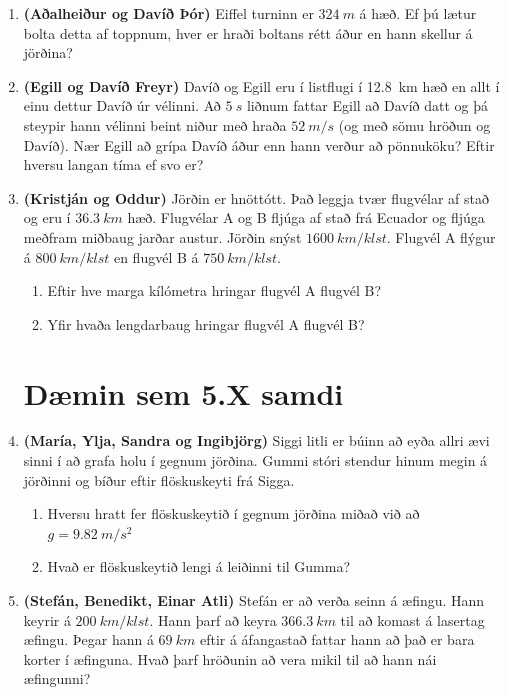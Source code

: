 \begin{enumerate}[label = \textbf{Dæmi \thechapter.\arabic*.}]
\item \textbf{(Aðalheiður og Davíð Þór)} Eiffel turninn er $\SI{324}{m}$ á hæð. Ef þú lætur bolta detta af toppnum, hver er hraði boltans rétt áður en hann skellur á jörðina?

\item \textbf{(Egill og Davíð Freyr)} Davíð og Egill eru í listflugi í \SI{12.8}{km} hæð en allt í einu dettur Davíð úr vélinni. Að $\SI{5}{s}$ liðnum fattar Egill að Davíð datt og þá steypir hann vélinni beint niður með hraða $\SI{52}{m/s}$ (og með sömu hröðun og Davíð). Nær Egill að grípa Davíð áður enn hann verður að pönnuköku? Eftir hversu langan tíma ef svo er?

\item \textbf{(Kristján og Oddur)} Jörðin er hnöttótt. Það leggja tvær flugvélar af stað og eru í $\SI{36.3}{km}$ hæð. Flugvélar A og B fljúga af stað frá Ecuador og fljúga meðfram miðbaug jarðar austur. Jörðin snýst $\SI{1600}{km/klst}$. Flugvél A flýgur á $\SI{800}{km/klst}$ en flugvél B á $\SI{750}{km/klst}$.
\begin{enumerate}[label = \textbf{(\alph*)}]
    \item Eftir hve marga kílómetra hringar flugvél A flugvél B?
    \item Yfir hvaða lengdarbaug hringar flugvél A flugvél B?
\end{enumerate}

\section*{Dæmin sem 5.X samdi}

\item \textbf{(María, Ylja, Sandra og Ingibjörg)} Siggi litli er búinn að eyða allri ævi sinni í að grafa holu í gegnum jörðina. Gummi stóri stendur hinum megin á jörðinni og bíður eftir flöskuskeyti frá Sigga.
\begin{enumerate}[label = \textbf{(\alph*)}]
    \item Hversu hratt fer flöskuskeytið í gegnum jörðina miðað við að $g = \SI{9.82}{m/s^2}$
    
    \item Hvað er flöskuskeytið lengi á leiðinni til Gumma?
\end{enumerate}

\item \textbf{(Stefán, Benedikt, Einar Atli)} Stefán er að verða seinn á æfingu. Hann keyrir á $\SI{200}{km/klst}$. Hann þarf að keyra $\SI{366.3}{km}$ til að komast á lasertag æfingu. Þegar hann á $\SI{69}{km}$ eftir á áfangastað fattar hann að það er bara korter í æfinguna. Hvað þarf hröðunin að vera mikil til að hann nái æfingunni?


\end{enumerate}
